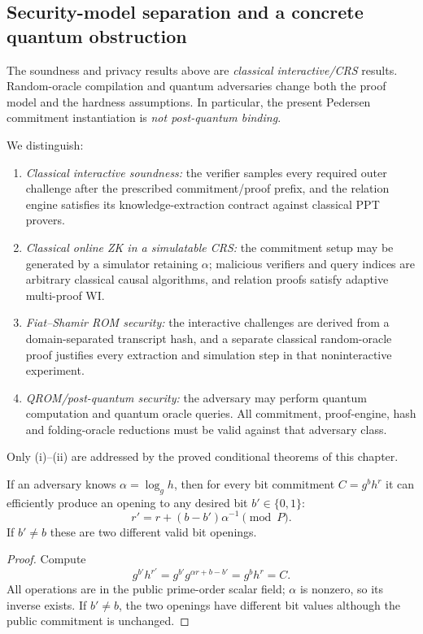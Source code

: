 \subsection{Security-model separation and a concrete quantum obstruction}\label{sec:security14:models}
The soundness and privacy results above are
\emph{classical interactive/CRS} results.
Random-oracle compilation and quantum adversaries
change both the proof model and the hardness
assumptions. In particular, the present
Pedersen commitment instantiation is
\emph{not post-quantum binding}.

\begin{definition}\label{def:security14:models}
We distinguish:
\begin{enumerate}[label=\textup{(\roman*)}]
\item \emph{Classical interactive soundness:}
the verifier samples every required
outer challenge after the prescribed
commitment/proof prefix, and the
relation engine satisfies its
knowledge-extraction contract
against classical PPT provers.
\item \emph{Classical online ZK in a simulatable CRS:}
the commitment setup may be generated
by a simulator retaining $\alpha$;
malicious verifiers and query indices
are arbitrary classical causal
algorithms, and relation proofs
satisfy adaptive multi-proof WI.
\item \emph{Fiat--Shamir ROM security:}
the interactive challenges are
derived from a domain-separated
transcript hash, and a separate
classical random-oracle proof
justifies every extraction and
simulation step in that
noninteractive experiment.
\item \emph{QROM/post-quantum security:}
the adversary may perform quantum
computation and quantum oracle
queries. All commitment,
proof-engine, hash and
folding-oracle reductions
must be valid against that
adversary class.
\end{enumerate}
Only (i)--(ii) are addressed by
the proved conditional
theorems of this chapter.
\end{definition}

\begin{lemma}\label{lem:security14:known-alpha}
If an adversary knows
$\alpha=\log_g h$, then for
every bit commitment
$C=g^b h^r$ it can efficiently
produce an opening to any
desired bit $b'\in\{0,1\}$:
\[
 \boxed{
 r'=r+(b-b')\alpha^{-1}\pmod P.}
\]
If $b'\neq b$ these are two
different valid bit openings.
\end{lemma}
\begin{proof}
Compute
\[
 g^{b'}h^{r'}
 =g^{b'}g^{\alpha r+b-b'}
 =g^b h^r=C.
\]
All operations are in
the public prime-order
scalar field; $\alpha$
is nonzero, so its inverse
exists. If $b'\ne b$,
the two openings have
different bit values
although the public
commitment is unchanged.
\end{proof}


